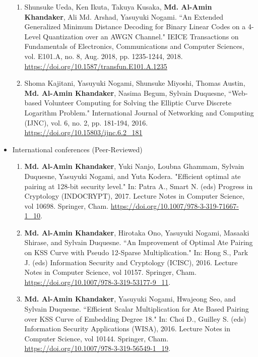 \begin{itemize}
\begin{enumerate}
	\item	Shunsuke Ueda, Ken Ikuta, Takuya Kusaka,  \textbf{Md. Al-Amin Khandaker}, Ali Md. Arshad, Yasuyuki Nogami. ``An Extended Generalized Minimum Distance Decoding for Binary Linear Codes on a 4-Level Quantization over an AWGN Channel." IEICE Transactions on Fundamentals of Electronics, Communications and Computer Sciences, vol. E101.A, no. 8, Aug. 2018, pp. 1235-1244, 2018. \url{https://doi.org/10.1587/transfun.E101.A.1235}
	
	\item Shoma Kajitani, Yasuyuki Nogami, Shunsuke Miyoshi, Thomas Austin, \textbf{Md. Al-Amin Khandaker}, Nasima Begum, Sylvain Duquesne, ``Web-based Volunteer Computing for Solving the Elliptic Curve Discrete Logarithm Problem." International Journal of Networking and Computing (IJNC), vol. 6, no. 2, pp. 181-194, 2016.
	\url{https://doi.org/10.15803/ijnc.6.2_181}
	
\end{enumerate}
\newpage
\item International conferences (Peer-Reviewed)
\normalsize
\begin{enumerate}
	
	\item \textbf{Md. Al-Amin Khandaker}, Yuki Nanjo, Loubna Ghammam, Sylvain Duquesne, Yasuyuki Nogami, and Yuta Kodera. "Efficient optimal ate pairing at 128-bit security level." In: Patra A., Smart N. (eds) Progress in Cryptology (INDOCRYPT), 2017. Lecture Notes in Computer Science, vol 10698. Springer, Cham.
	\url{https://doi.org/10.1007/978-3-319-71667-1_10}.
	
	\item \textbf{Md. Al-Amin Khandaker}, Hirotaka Ono, Yasuyuki Nogami, Masaaki Shirase, and Sylvain Duquesne. ``An Improvement of Optimal Ate Pairing on KSS Curve with Pseudo 12-Sparse Multiplication." In: Hong S., Park J. (eds) Information Security and Cryptology (ICISC), 2016. Lecture Notes in Computer Science, vol 10157. Springer, Cham. \url{https://doi.org/10.1007/978-3-319-53177-9_11}.
	
		\item \textbf{Md. Al-Amin Khandaker}, Yasuyuki Nogami, Hwajeong Seo, and Sylvain Duquesne. ``Efficient Scalar Multiplication for Ate Based Pairing over KSS Curve of Embedding Degree 18." In: Choi D., Guilley S. (eds) Information Security Applications (WISA), 2016. Lecture Notes in Computer Science, vol 10144. Springer, Cham. \url{https://doi.org/10.1007/978-3-319-56549-1_19}. 


\end{enumerate}
\end{itemize}
